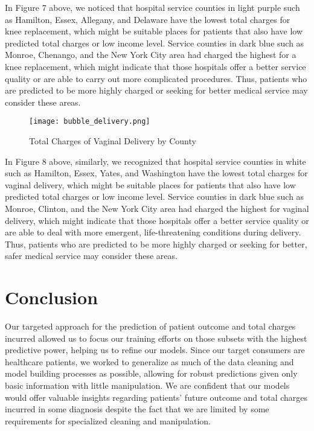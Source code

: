 \documentclass[12pt]{article}
\begin{document}
\noindent In Figure 7 above, we noticed that hospital service counties in light purple such as Hamilton, Essex, Allegany, and Delaware have the lowest total charges for knee replacement, which might be suitable places for patients that also have low predicted total charges or low income level. Service counties in dark blue such as Monroe, Chenango, and the New York City area had charged the highest for a knee replacement, which might indicate that those hospitals offer a better service quality or are able to carry out more complicated procedures. Thus, patients who are predicted to be more highly charged or seeking for better medical service may consider these areas.
\begin{figure}[H]
\texttt{[image: bubble\_delivery.png]}
\caption{Total Charges of Vaginal Delivery by County}
\end{figure}

\noindent In Figure 8 above, similarly, we recognized that hospital service counties in white such as Hamilton, Essex, Yates, and Washington have the lowest total charges for vaginal delivery, which might be suitable places for patients that also have low predicted total charges or low income level. Service counties in dark blue such as Monroe, Clinton, and the New York City area had charged the highest for vaginal delivery, which might indicate that those hospitals offer a better service quality or are able to deal with more emergent, life-threatening conditions during delivery. Thus, patients who are predicted to be more highly charged or seeking for better, safer medical service may consider these areas.

\section{Conclusion}
Our targeted approach for the prediction of patient outcome and total charges incurred allowed us to focus our training efforts on those subsets with the highest predictive power, helping us to refine our models. Since our target consumers are healthcare patients, we worked to generalize as much of the data cleaning and model building processes as possible, allowing for robust predictions given only basic information with little manipulation. We are confident that our models would offer valuable insights regarding patients' future outcome and total charges incurred in some diagnosis despite the fact that we are limited by some requirements for specialized cleaning and manipulation. \bigskip 
\end{document}
